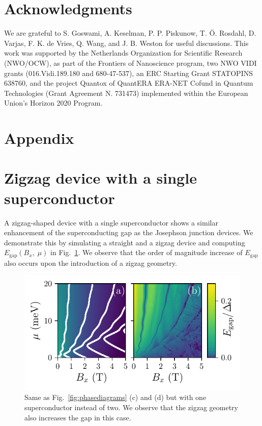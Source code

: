\section{Acknowledgments}
We are grateful to  S. Goswami, A. Keselman, P. P. Piskunow, T. Ö. Rosdahl, D. Varjas, F. K. de Vries, Q. Wang, and J. B. Weston for useful discussions.
This work was supported by the Netherlands Organization for Scientific Research (NWO/OCW), as part of the Frontiers of Nanoscience program, two NWO VIDI grants (016.Vidi.189.180 and 680-47-537), an ERC Starting Grant STATOPINS 638760, and the project Quantox of QuantERA ERA-NET Cofund in Quantum Technologies (Grant Agreement N. 731473) implemented within the European Union's Horizon 2020 Program.

\section{Appendix}

\section{Zigzag device with a single superconductor}\label{appendix:NS_junction}

A zigzag-shaped device with a single superconductor shows a similar enhancement of the superconducting gap as the Josephson junction devices.
We demonstrate this by simulating a straight and a zigzag device and computing $E_\textrm{gap}(B_x, \; \mu)$ in Fig.~\ref{fig:ns_junction}.
We observe that the order of magnitude increase of $E_\textrm{gap}$ also occurs upon the introduction of a zigzag geometry.

\begin{figure}
\begin{center}
\includegraphics[width=0.6\columnwidth]{chapter_zigzag/figures/phasediagrams_NS.pdf}
\caption{Same as Fig.~\ref{fig:phasediagrams} (c) and (d) but with one superconductor instead of two.
We observe that the zigzag geometry also increases the gap in this case.
\label{fig:ns_junction}}
\end{center}
\end{figure}

